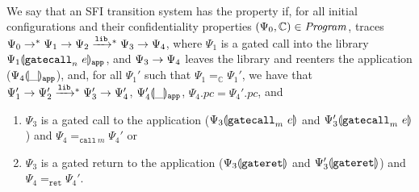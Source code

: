 \begin{definition}[\StrongNI{}]{~}

  We say that an SFI transition system has the \strongni{} property if,
  for all initial configurations and their confidentiality properties $(\Psi_0, \mathbb{C}) \in \mathit{Program}$,
  traces $\Psi_0 \stepstar \Psi_1 \step \Psi_2 \steplowstar \Psi_3 \step \Psi_4$,
  where $\Psi_1$ is a gated call into the library
  ${\Psi_1}\llparenthesis{\ensuremath{\mathtt{gatecall}_{n}\ {e}}}\rrparenthesis_{\mathtt{app}}$,
  and $\Psi_3 \mathrel{\rightarrow} \Psi_4$ leaves the library and reenters the application
  (${\Psi_4}\llparenthesis{\_}\rrparenthesis_{\mathtt{app}}$),
  and, for all $\Psi_1'$ such that $\Psi_1 =_{\mathbb{C}}
  \Psi_1'$, we have that $\Psi_1' \step \Psi_2' \steplowstar \Psi_3' \step \Psi_4'$,
  ${\Psi_4'}\llparenthesis{\_}\rrparenthesis_{\mathtt{app}}$, $\Psi_4.pc = \Psi_4'.pc$, and
  \begin{enumerate}
  \item $\Psi_3$ is a gated call to the application (${\Psi_3}\llparenthesis{\ensuremath{\mathtt{gatecall}_{m}\ {e}}}\rrparenthesis$ and ${\Psi_3'}\llparenthesis{\ensuremath{\mathtt{gatecall}_{m}\ {e}}}\rrparenthesis$) and $\Psi_4 =_{\mathtt{call}\ m} \Psi_4'$ or
  \item $\Psi_3$ is a gated return to the application (${\Psi_3}\llparenthesis{\ensuremath{\mathtt{gateret}}}\rrparenthesis$ and ${\Psi_3'}\llparenthesis{\ensuremath{\mathtt{gateret}}}\rrparenthesis$) and $\Psi_4 =_{\mathtt{ret}} \Psi_4'$.
  \end{enumerate}
\end{definition}